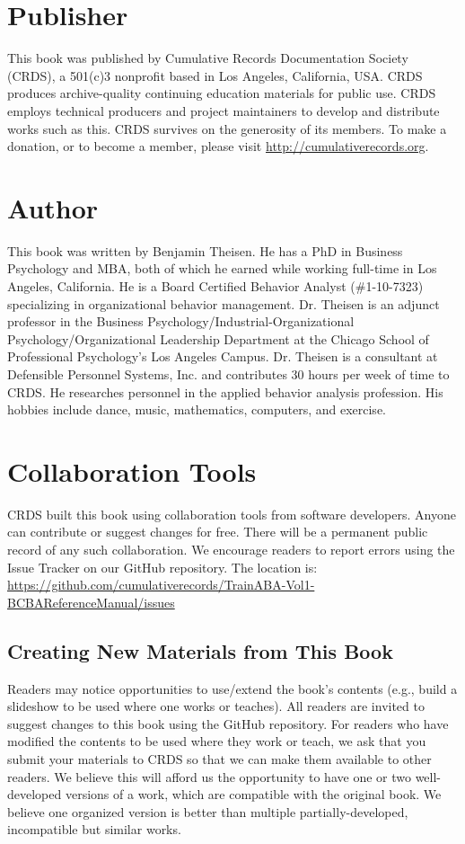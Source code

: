 \documentclass[float=false, crop=false]{standalone}
\begin{document}
\section{Publisher}
This book was published by Cumulative Records Documentation Society (CRDS), a 501(c)3 nonprofit based in Los Angeles, California, USA. CRDS produces archive-quality continuing education materials for public use. CRDS employs technical producers and project maintainers to develop and distribute works such as this. CRDS survives on the generosity of its members. To make a donation, or to become a member, please visit \url{http://cumulativerecords.org}.

\section{Author}
This book was written by Benjamin Theisen. He has a PhD in Business Psychology and MBA, both of which he earned while working full-time in Los Angeles, California. He is a Board Certified Behavior Analyst (\#1-10-7323) specializing in organizational behavior management. Dr. Theisen is an adjunct professor in the Business Psychology/Industrial-Organizational Psychology/Organizational Leadership Department at the Chicago School of Professional Psychology's Los Angeles Campus. Dr. Theisen is a consultant at Defensible Personnel Systems, Inc. and contributes 30 hours per week of time to CRDS. He researches personnel in the applied behavior analysis profession. His hobbies include dance, music, mathematics, computers, and exercise.

\section{Collaboration Tools}
CRDS built this book using collaboration tools from software developers. Anyone can contribute or suggest changes for free. There will be a permanent public record of any such collaboration. We encourage readers to report errors using the Issue Tracker on our GitHub repository. The location is: \url{https://github.com/cumulativerecords/TrainABA-Vol1-BCBAReferenceManual/issues}

\subsection{Creating New Materials from This Book}
Readers may notice opportunities to use/extend the book's contents (e.g., build a slideshow to be used where one works or teaches). All readers are invited to suggest changes to this book using the GitHub repository. For readers who have modified the contents to be used where they work or teach, we ask that you submit your materials to CRDS so that we can make them available to other readers. We believe this will afford us the opportunity to have one or two well-developed versions of a work, which are compatible with the original book. We believe one organized version is better than multiple partially-developed, incompatible but similar works. 
\end{document}
